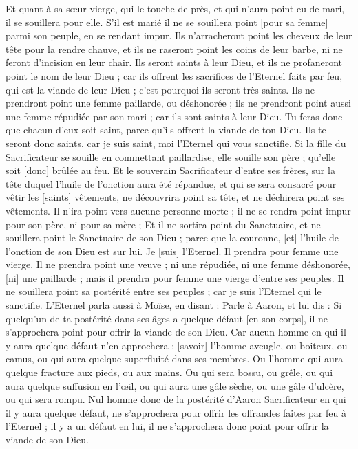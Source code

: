 \begin{multicols}{2}
Et quant à sa sœur vierge, qui le touche de près, et qui n'aura point eu de mari, il se souillera pour elle.
S'il est marié il ne se souillera point [pour sa femme] parmi son peuple, en se rendant impur.
Ils n'arracheront point les cheveux de leur tête pour la rendre chauve, et ils ne raseront point les coins de leur barbe, ni ne feront d'incision en leur chair.
Ils seront saints à leur Dieu, et ils ne profaneront point le nom de leur Dieu ; car ils offrent les sacrifices de l'Eternel faits par feu, qui est la viande de leur Dieu ; c'est pourquoi ils seront très-saints.
Ils ne prendront point une femme paillarde, ou déshonorée ; ils ne prendront point aussi une femme répudiée par son mari ; car ils sont saints à leur Dieu.
Tu feras donc que chacun d'eux soit saint, parce qu'ils offrent la viande de ton Dieu. Ils te seront donc saints, car je suis saint, moi l'Eternel qui vous sanctifie.
Si la fille du Sacrificateur se souille en commettant paillardise, elle souille son père ; qu'elle soit [donc] brûlée au feu.
Et le souverain Sacrificateur d'entre ses frères, sur la tête duquel l'huile de l'onction aura été répandue, et qui se sera consacré pour vêtir les [saints] vêtements, ne découvrira point sa tête, et ne déchirera point ses vêtements.
Il n'ira point vers aucune personne morte ; il ne se rendra point impur pour son père, ni pour sa mère ;
Et il ne sortira point du Sanctuaire, et ne souillera point le Sanctuaire de son Dieu ; parce que la couronne, [et] l'huile de l'onction de son Dieu est sur lui. Je [suis] l'Eternel.
Il prendra pour femme une vierge.
Il ne prendra point une veuve ; ni une répudiée, ni une femme déshonorée, [ni] une paillarde ; mais il prendra pour femme une vierge d'entre ses peuples.
Il ne souillera point sa postérité entre ses peuples ; car je suis l'Eternel qui le sanctifie.
L'Eternel parla aussi à Moïse, en disant :
Parle à Aaron, et lui dis : Si quelqu'un de ta postérité dans ses âges a quelque défaut [en son corps], il ne s'approchera point pour offrir la viande de son Dieu.
Car aucun homme en qui il y aura quelque défaut n'en approchera ; [savoir] l'homme aveugle, ou boiteux, ou camus, ou qui aura quelque superfluité dans ses membres.
Ou l'homme qui aura quelque fracture aux pieds, ou aux mains.
Ou qui sera bossu, ou grêle, ou qui aura quelque suffusion en l'œil, ou qui aura une gâle sèche, ou une gâle d'ulcère, ou qui sera rompu.
Nul homme donc de la postérité d'Aaron Sacrificateur en qui il y aura quelque défaut, ne s'approchera pour offrir les offrandes faites par feu à l'Eternel ; il y a un défaut en lui, il ne s'approchera donc point pour offrir la viande de son Dieu.

\end{multicols}
